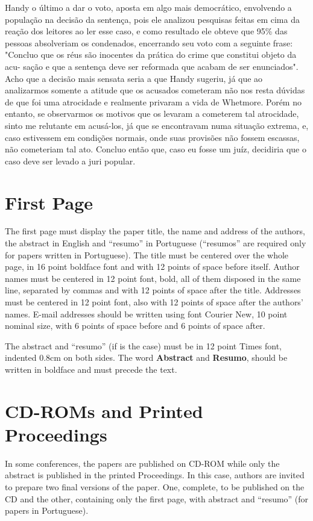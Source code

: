 \documentclass[12pt]{article}
\begin{document}
Handy o último a dar o voto, aposta em algo mais democrático, envolvendo a população na decisão da sentença, pois ele analizou pesquisas feitas em cima da reação dos leitores ao ler esse caso, e como resultado ele obteve que 95\% das pessoas absolveriam os condenados, encerrando seu voto com a seguinte frase: "Concluo que os réus são inocentes da prática do crime que constitui objeto da acu-
sação e que a sentença deve ser reformada que acabam de ser enunciados".
Acho que a decisão mais sensata seria a que Handy sugeriu, já que ao analizarmos somente a atitude que os acusados cometeram não nos resta dúvidas de que foi uma atrocidade e realmente privaram a vida de Whetmore. Porém no entanto, se observarmos os motivos que os levaram a cometerem tal atrocidade, sinto me relutante em acusá-los, já que se encontravam numa situação extrema, e, caso estivessem em condições normais, onde suas provisões não fossem escassas, não cometeriam tal ato.
Concluo então que, caso eu fosse um juíz, decidiria que o caso deve ser levado a juri popular.
\section{First Page} \label{sec:firstpage}

The first page must display the paper title, the name and address of the
authors, the abstract in English and ``resumo'' in Portuguese (``resumos'' are
required only for papers written in Portuguese). The title must be centered
over the whole page, in 16 point boldface font and with 12 points of space
before itself. Author names must be centered in 12 point font, bold, all of
them disposed in the same line, separated by commas and with 12 points of
space after the title. Addresses must be centered in 12 point font, also with
12 points of space after the authors' names. E-mail addresses should be
written using font Courier New, 10 point nominal size, with 6 points of space
before and 6 points of space after.

The abstract and ``resumo'' (if is the case) must be in 12 point Times font,
indented 0.8cm on both sides. The word \textbf{Abstract} and \textbf{Resumo},
should be written in boldface and must precede the text.

\section{CD-ROMs and Printed Proceedings}

In some conferences, the papers are published on CD-ROM while only the
abstract is published in the printed Proceedings. In this case, authors are
invited to prepare two final versions of the paper. One, complete, to be
published on the CD and the other, containing only the first page, with
abstract and ``resumo'' (for papers in Portuguese).
\end{document}

